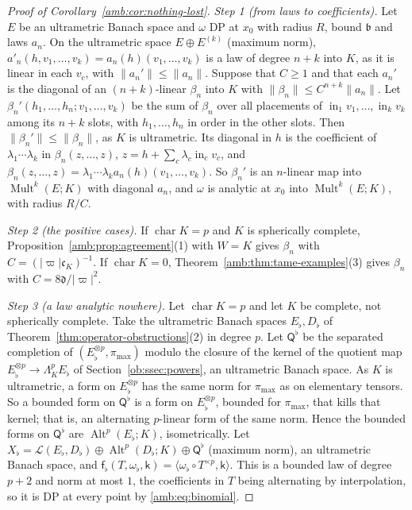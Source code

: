 \documentclass[11pt]{amsart}
\theoremstyle{definition}
\theoremstyle{remark}
\numberwithin{equation}{section}
\newcommand{\cL}{\mathcal L}
\newcommand{\Alt}{\operatorname{Alt}}
\newcommand{\Mult}{\operatorname{Mult}}
\newcommand{\abs}[1]{\lvert #1\rvert}
\newcommand{\norm}[1]{\lVert #1\rVert}
\theoremstyle{plain}
\theoremstyle{definition}
\theoremstyle{plain}
\begin{document}
\begin{proof}[Proof of Corollary~\ref{amb:cor:nothing-lost}]
\emph{Step 1 (from laws to coefficients).} Let $E$ be an ultrametric Banach space and $\omega$ DP at $x_0$ with radius $R$, bound $\mathfrak b$ and laws $a_n$. On the ultrametric space $E\oplus E^{(k)}$ (maximum norm), $a'_n(h,v_1,\dots,v_k)=a_n(h)(v_1,\dots,v_k)$ is a law of degree $n+k$ into $K$, as it is linear in each $v_c$, with $\norm{a_n'}\le\norm{a_n}$. Suppose that $C\ge1$ and that each $a_n'$ is the diagonal of an $(n+k)$-linear $\beta_n$ into $K$ with $\norm{\beta_n}\le C^{n+k}\norm{a_n}$. Let $\beta_n'(h_1,\dots,h_n;v_1,\dots,v_k)$ be the sum of $\beta_n$ over all placements of $\operatorname{in}_1v_1,\dots,\operatorname{in}_kv_k$ among its $n+k$ slots, with $h_1,\dots,h_n$ in order in the other slots. Then $\norm{\beta_n'}\le\norm{\beta_n}$, as $K$ is ultrametric. Its diagonal in $h$ is the coefficient of $\lambda_1\cdots\lambda_k$ in $\beta_n(z,\dots,z)$, $z=h+\sum_c\lambda_c\operatorname{in}_cv_c$, and $\beta_n(z,\dots,z)=\lambda_1\cdots\lambda_ka_n(h)(v_1,\dots,v_k)$. So $\beta_n'$ is an $n$-linear map into $\Mult^k(E;K)$ with diagonal $a_n$, and $\omega$ is analytic at $x_0$ into $\Mult^k(E;K)$, with radius $R/C$.

\emph{Step 2 (the positive cases).} If $\operatorname{char}K=p$ and $K$ is spherically complete, Proposition~\ref{amb:prop:agreement}(1) with $W=K$ gives $\beta_n$ with $C=(\abs\varpi\mathfrak c_K)^{-1}$. If $\operatorname{char}K=0$, Theorem~\ref{amb:thm:tame-examples}(3) gives $\beta_n$ with $C=8\mathfrak d/\abs\varpi^2$.

\emph{Step 3 (a law analytic nowhere).} Let $\operatorname{char}K=p$ and let $K$ be complete, not spherically complete. Take the ultrametric Banach spaces $E_\flat,D_\flat$ of Theorem~\ref{thm:operator-obstructions}(2) in degree $p$. Let $\mathsf Q^\flat$ be the separated completion of $(E_\flat^{\otimes p},\pi_{\max})$ modulo the closure of the kernel of the quotient map $E_\flat^{\otimes p}\to\Lambda^p_KE_\flat$ of Section~\ref{ob:ssec:powers}, an ultrametric Banach space. As $K$ is ultrametric, a form on $E_\flat^{\otimes p}$ has the same norm for $\pi_{\max}$ as on elementary tensors. So a bounded form on $\mathsf Q^\flat$ is a form on $E_\flat^{\otimes p}$, bounded for $\pi_{\max}$, that kills that kernel; that is, an alternating $p$-linear form of the same norm. Hence the bounded forms on $\mathsf Q^\flat$ are $\Alt^p(E_\flat;K)$, isometrically. Let $X_\flat=\cL(E_\flat,D_\flat)\oplus\Alt^p(D_\flat;K)\oplus\mathsf Q^\flat$ (maximum norm), an ultrametric Banach space, and $\mathsf f_\flat(T,\omega_\flat,\mathsf k)=\langle\omega_\flat\circ T^{\times p},\mathsf k\rangle$. This is a bounded law of degree $p+2$ and norm at most $1$, the coefficients in $T$ being alternating by interpolation, so it is DP at every point by \eqref{amb:eq:binomial}.


\end{proof}
\end{document}
